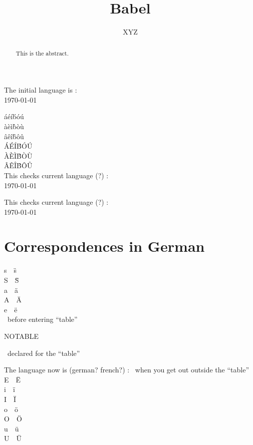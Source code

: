 \documentclass{article}
\title{Babel}
\author{XYZ}
\begin{document}
The initial language is : 
\\
\today\\
\newcommand{\DQ}[1]{\dq#1~~\"#1}

\maketitle

\'a\'e\'i\'b\'o\'u\\
\`a\`e\`i\`b\`o\`u\\
\^a\^e\^i\^b\^o\^u\\
\'A\'E\'I\'B\'O\'U\\
\`A\`E\`I\`B\`O\`U\\
\^A\^E\^I\^B\^O\^U\\
This checks current language (?) : %
{}\\
\today\\
\tableofcontents

This checks current language (?) : %
{}\\
\today\\
\begin{abstract}
This is the abstract.
\end{abstract}

\section{Correspondences in German}
\DQ{s}\\
\DQ{S}\\
\DQ{a}\\
\DQ{A}\\
\DQ{e}\\
~before entering ``table''
\begin{table}
\caption{NOTABLE}
~declared for the ``table''
\end{table}
The language now is (german? french?) : 
~when you get out outside the ``table''\\
\DQ{E}\\
\DQ{i}\\
\DQ{I}\\
\DQ{o}\\
\DQ{O}\\
\DQ{u}\\
\DQ{U}
\end{document}
